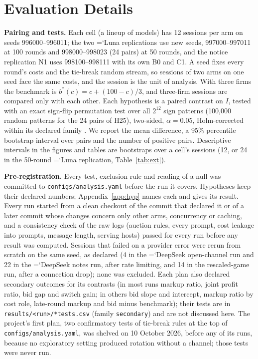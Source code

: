 \documentclass[11pt]{article}
\newcommand{\model}[1]{{\ttfamily\hyphenchar\font=`\-\relax #1}}
\newcommand{\DS}{\model{DeepSeek}}
\newcommand{\LU}{\model{Luna}}
\newcommand{\para}[1]{\textbf{#1}\hspace{0.4em}}
\begin{document}
\section{Evaluation Details}
\label{app:eval}

\para{Pairing and tests.} Each cell (a lineup of models) has 12 sessions per arm on seeds 996000--996011; the two \LU{} replications use new seeds, 997000--997011 at 100 rounds and 998000--998023 (24 pairs) at 50 rounds, and the notice replication N1 uses 998100--998111 with its own \textcolor{cB}{B0} and \textcolor{cC}{C1}. A seed fixes every round's costs and the tie-break random stream, so sessions of two arms on one seed face the same costs, and the session is the unit of analysis. With three firms the benchmark is $b^*(c) = c + (100 - c)/3$, and three-firm sessions are compared only with each other. Each hypothesis is a paired contrast on $I$, tested with an exact sign-flip permutation test \citep{good2000} over all $2^{12}$ sign patterns (100{,}000 random patterns for the 24 pairs of H25), two-sided, $\alpha = 0.05$, Holm-corrected within its declared family \citep{holm1979}. We report the mean difference, a 95\% percentile bootstrap interval over pairs \citep[10{,}000 resamples;][]{efron1993} and the number of positive pairs. Descriptive intervals in the figures and tables are bootstraps over a cell's sessions (12, or 24 in the 50-round \LU{} replication, Table~\ref{tab:ext}).

\para{Pre-registration.} Every test, exclusion rule and reading of a null was committed to \texttt{configs/analysis.yaml} before the run it covers. Hypotheses keep their declared numbers; Appendix~\ref{app:hyp} names each and gives its result. Every run started from a clean checkout of the commit that declared it or of a later commit whose changes concern only other arms, concurrency or caching, and a consistency check of the raw logs (auction rules, every prompt, cost leakage into prompts, message length, serving hosts) passed for every run before any result was computed. Sessions that failed on a provider error were rerun from scratch on the same seed, as declared (4 in the \DS{} open-channel run and 22 in the \DS{} notes run, after rate limiting, and 14 in the rescaled-game run, after a connection drop); none was excluded. Each plan also declared secondary outcomes for its contrasts (in most runs markup ratio, joint profit ratio, bid gap and switch gain; in others bid slope and intercept, markup ratio by cost role, late-round markup and bid minus benchmark); their tests are in \texttt{results/<run>/*tests.csv} (family \texttt{secondary}) and are not discussed here. The project's first plan, two confirmatory tests of tie-break rules at the top of \texttt{configs/analysis.yaml}, was shelved on 10 October 2026, before any of its runs, because no exploratory setting produced rotation without a channel; those tests were never run.
\end{document}
